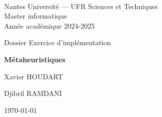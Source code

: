 \documentclass[a4paper,10pt]{article}
\begin{document}
~
\vspace{50mm}
{\large
\begin{center}
  Nantes Université --- UFR Sciences et Techniques\\
  Master informatique\\
  Année académique 2024-2025
  \vspace{30mm}
 
  { \LARGE
 
     Dossier Exercice d'implémentation\\
     \vspace{5mm}
 
     {\huge \textbf{Métaheuristiques}}
     \vspace{5mm}
 
     Xavier \textsc{HOUDART}%
     
     Djibril \textsc{RAMDANI}%
     \vspace{50mm}
  
     \today
  }  
\end{center}
}

\vfill
\break


 


  

\vspace{300mm}
 

\end{document}
